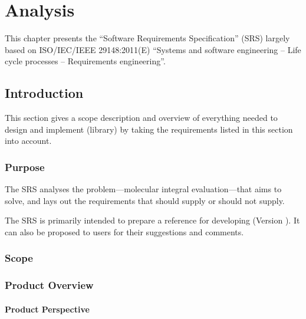 \chapter{Analysis}
\label{chapter-analysis}

This chapter presents the ``Software Requirements Specification'' (SRS) largely
based on ISO/IEC/IEEE 29148:2011(E) ``Systems and software engineering -- Life
cycle processes -- Requirements engineering''.

\section{Introduction}

This section gives a scope description and overview of everything needed to
design and implement \LibName (library) by taking the requirements listed in
this section into account.

\subsection{Purpose}

The SRS analyses the problem---molecular integral evaluation---that \LibName
aims to solve, and lays out the requirements that \LibName should supply or
should not supply.

The SRS is primarily intended to prepare a reference for developing \LibName
(Version \LibVersion). It can also be proposed to \LibName users for their
suggestions and comments.

\subsection{Scope}


\subsection{Product Overview}

\subsubsection{Product Perspective}

